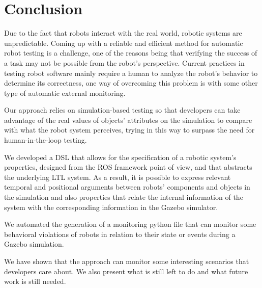 \chapter{Conclusion}
\label{chap:conclusion}


Due to the fact that robots interact with the real world, robotic systems are unpredictable. Coming up with a reliable and efficient method for automatic robot testing is a challenge, one of the reasons being that verifying the success of a task may not be possible from the robot's perspective. Current practices in testing robot software mainly require a human to analyze the robot's behavior to determine its correctness, one way of overcoming this problem is with some other type of automatic external monitoring.

Our approach relies on simulation-based testing so that developers can take advantage of the real values of objects'
attributes on the simulation to compare with what the robot system perceives, trying in this way to surpass the need for human-in-the-loop testing.

We developed a DSL that allows for the specification of a robotic system's properties, designed from the ROS framework point of view, and that abstracts the underlying LTL system. As a result, it is possible to express relevant temporal and positional arguments between robots' components and objects in the simulation and also properties that relate the internal information of the system with the corresponding information in the Gazebo simulator.

We automated the generation of a monitoring python file that can monitor some behavioral violations of robots in relation to their state or events during a Gazebo simulation.

We have shown that the approach can monitor some interesting scenarios that developers care about. We also present what is still left to do and what future work is still needed.
